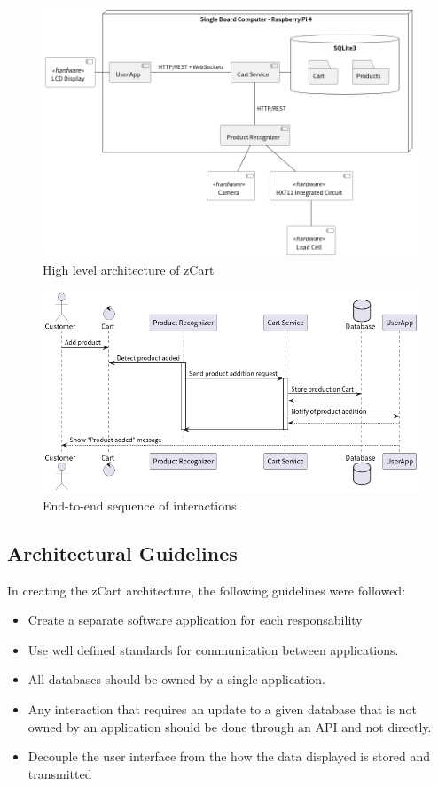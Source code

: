 \documentclass[openright]{normas-utf-tex} %
\begin{document}
\begin{figure}[H]
	\centering
	\includegraphics[width=1\textwidth]{./images/zCart.png}
	\caption[High level architecture of zCart]{High level architecture of zCart}
	\label{fig:architecture}
\end{figure}


\begin{figure}[H]
	\centering
	\includegraphics[width=1\textwidth]{./images/E2E.png}
	\caption[End-to-end sequence of interactions]{End-to-end sequence of interactions}
	\label{fig:e2eseq}
\end{figure}

\subsection{Architectural Guidelines}
In creating the zCart architecture, the following guidelines were followed:

\begin{itemize}
    \item Create a separate software application for each responsability
    \item Use well defined standards for communication between applications.
    \item All databases should be owned by a single application. 
    \item Any interaction that requires an update to a given database that is
        not owned by an application should be done through an API and not
        directly.
    \item Decouple the user interface from the how the data displayed is stored and transmitted
\end{itemize}
\end{document}
